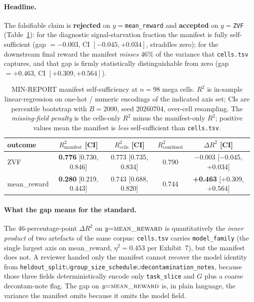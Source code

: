 \documentclass{article}  \usepackage[preprint,nonatbib]{neurips_2026} \usepackage[numbers]{natbib}
\providecommand{\tableref}[1]{Table~\ref{#1}}
\begin{document}
\paragraph{Headline.}
The falsifiable claim is \textbf{rejected} on
$y{=}$\texttt{mean\_reward} and \textbf{accepted} on $y{=}$\texttt{ZVF}
(\tableref{tab:p5-manifest-self-suff}):
for the diagnostic signal-starvation fraction the manifest is fully
self-sufficient (gap $=-0.003$, CI $[-0.045, +0.034]$, straddles zero);
for the downstream final reward the manifest \emph{misses} $46\%$ of
the variance that \texttt{cells.tsv} captures, and that gap is firmly
statistically distinguishable from zero (gap $=+0.463$, CI
$[+0.309, +0.564]$).

\begin{table}[t]
\centering\small
\caption{MIN-REPORT manifest self-sufficiency at $n{=}98$ mega cells.
$R^2$ is in-sample linear-regression on one-hot / numeric encodings of
the indicated axis set; CIs are percentile bootstrap with
$B{=}2000$, seed 20260704, over-cell resampling. The
\emph{missing-field penalty} is the cells-only $R^2$ minus the
manifest-only $R^2$; positive values mean the manifest is
\emph{less} self-sufficient than \texttt{cells.tsv}.}
\label{tab:p5-manifest-self-suff}
\begin{tabular}{lcccc}
\toprule
outcome & $R^2_\text{manifest}$ [CI] & $R^2_\text{cells}$ [CI] & $R^2_\text{combined}$ & $\Delta R^2$ [CI] \\
\midrule
ZVF          & \textbf{0.776} [0.730, 0.846] & 0.773 [0.735, 0.834] & 0.790 & $-$0.003 [$-$0.045, +0.034] \\
mean\_reward & \textbf{0.280} [0.219, 0.443] & 0.743 [0.688, 0.820] & 0.744 & \textbf{+0.463} [+0.309, +0.564] \\
\bottomrule
\end{tabular}
\end{table}

\paragraph{What the gap means for the standard.}
The 46-percentage-point $\Delta R^2$ on $y{=}\textsc{mean\_reward}$ is
quantitatively the \emph{inner product} of two artefacts of the same
corpus: \texttt{cells.tsv} carries \texttt{model\_family} (the single largest
axis on mean\_reward, $\eta^2{=}0.453$ per Exhibit~7), but the manifest
does not. A reviewer handed only the manifest cannot recover the model
identity from
\texttt{heldout\_split}$\cup$\texttt{group\_size\_schedule}$\cup$\texttt{decontamination\_notes},
because those three fields deterministically encode only
\texttt{task\_slice} and $G$ plus a coarse decontam-note flag. The
gap on $y{=}\textsc{mean\_reward}$ is, in plain language, the variance
the manifest omits because it omits the model field.
\end{document}
